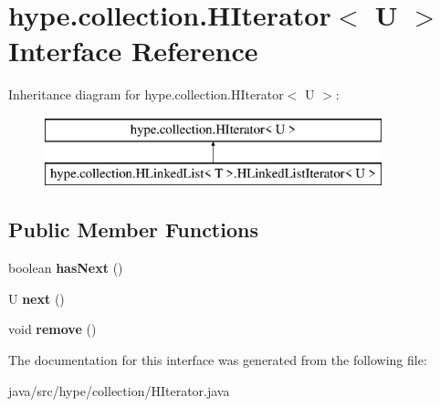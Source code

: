 \hypertarget{interfacehype_1_1collection_1_1_h_iterator_3_01_u_01_4}{\section{hype.\-collection.\-H\-Iterator$<$ U $>$ Interface Reference}
\label{interfacehype_1_1collection_1_1_h_iterator_3_01_u_01_4}
}
Inheritance diagram for hype.\-collection.\-H\-Iterator$<$ U $>$\-:\begin{figure}[H]
\begin{center}
\leavevmode
\includegraphics[height=2.000000cm]{interfacehype_1_1collection_1_1_h_iterator_3_01_u_01_4}
\end{center}
\end{figure}
\subsection*{Public Member Functions}
\begin{DoxyCompactItemize}
\item 
\hypertarget{interfacehype_1_1collection_1_1_h_iterator_3_01_u_01_4_a9bb4b33c5cd01aa182a7bcf765c0c632}{boolean {\bfseries has\-Next} ()}\label{interfacehype_1_1collection_1_1_h_iterator_3_01_u_01_4_a9bb4b33c5cd01aa182a7bcf765c0c632}

\item 
\hypertarget{interfacehype_1_1collection_1_1_h_iterator_3_01_u_01_4_a8bc0593ff91057153822cdc9e368e62d}{U {\bfseries next} ()}\label{interfacehype_1_1collection_1_1_h_iterator_3_01_u_01_4_a8bc0593ff91057153822cdc9e368e62d}

\item 
\hypertarget{interfacehype_1_1collection_1_1_h_iterator_3_01_u_01_4_a0d36232a70330edc753db8d43e57a91c}{void {\bfseries remove} ()}\label{interfacehype_1_1collection_1_1_h_iterator_3_01_u_01_4_a0d36232a70330edc753db8d43e57a91c}

\end{DoxyCompactItemize}


The documentation for this interface was generated from the following file\-:\begin{DoxyCompactItemize}
\item 
java/src/hype/collection/H\-Iterator.\-java\end{DoxyCompactItemize}
